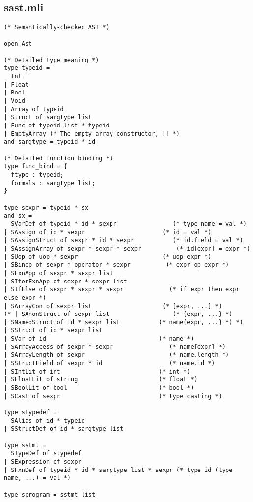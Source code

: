 \documentclass[main.tex]{subfiles}
\begin{document}
\subsection{sast.mli}
\begin{lstlisting}
(* Semantically-checked AST *)

open Ast

(* Detailed type meaning *)
type typeid =
  Int
| Float
| Bool
| Void
| Array of typeid
| Struct of sargtype list
| Func of typeid list * typeid
| EmptyArray (* The empty array constructor, [] *)
and sargtype = typeid * id

(* Detailed function binding *)
type func_bind = {
  ftype : typeid;
  formals : sargtype list;
}

type sexpr = typeid * sx
and sx = 
  SVarDef of typeid * id * sexpr                (* type name = val *)
| SAssign of id * sexpr                      (* id = val *)
| SAssignStruct of sexpr * id * sexpr           (* id.field = val *)
| SAssignArray of sexpr * sexpr * sexpr          (* id[expr] = expr *)
| SUop of uop * sexpr                        (* uop expr *)
| SBinop of sexpr * operator * sexpr          (* expr op expr *)
| SFxnApp of sexpr * sexpr list
| SIterFxnApp of sexpr * sexpr list
| SIfElse of sexpr * sexpr * sexpr             (* if expr then expr else expr *)
| SArrayCon of sexpr list                    (* [expr, ...] *)
(* | SAnonStruct of sexpr list                  (* {expr, ...} *)
| SNamedStruct of id * sexpr list           (* name{expr, ...} *) *)
| SStruct of id * sexpr list
| SVar of id                                (* name *)
| SArrayAccess of sexpr * sexpr                (* name[expr] *)
| SArrayLength of sexpr                        (* name.length *)
| SStructField of sexpr * id                   (* name.id *)
| SIntLit of int                            (* int *)
| SFloatLit of string                       (* float *)
| SBoolLit of bool                          (* bool *)
| SCast of sexpr                            (* type casting *)

type stypedef = 
  SAlias of id * typeid
| SStructDef of id * sargtype list

type sstmt = 
  STypeDef of stypedef
| SExpression of sexpr
| SFxnDef of typeid * id * sargtype list * sexpr (* type id (type name, ...) = val *)

type sprogram = sstmt list
\end{lstlisting}
\end{document}
